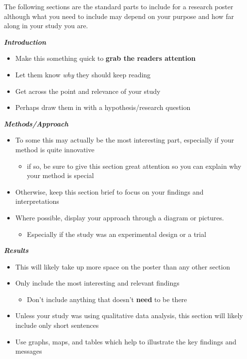 \documentclass[
]{book}
\providecommand{\tightlist}{%
  \setlength{\itemsep}{0pt}\setlength{\parskip}{0pt}}
\begin{document}
The following sections are the standard parts to include for a research poster although what you need to include may depend on your purpose and how far along in your study you are.

\textbf{\emph{Introduction}}

\begin{itemize}
\tightlist
\item
  Make this something quick to \textbf{grab the readers attention}
\item
  Let them know \emph{why} they should keep reading
\item
  Get across the point and relevance of your study
\item
  Perhaps draw them in with a hypothesis/research question
\end{itemize}

\textbf{\emph{Methods/Approach}}

\begin{itemize}
\tightlist
\item
  To some this may actually be the most interesting part, especially if your method is quite innovative

  \begin{itemize}
  \tightlist
  \item
    if so, be sure to give this section great attention so you can explain why your method is special
  \end{itemize}
\item
  Otherwise, keep this section brief to focus on your findings and interpretations
\item
  Where possible, display your approach through a diagram or pictures.

  \begin{itemize}
  \tightlist
  \item
    Especially if the study was an experimental design or a trial
  \end{itemize}
\end{itemize}

\textbf{\emph{Results}}

\begin{itemize}
\tightlist
\item
  This will likely take up more space on the poster than any other section
\item
  Only include the most interesting and relevant findings

  \begin{itemize}
  \tightlist
  \item
    Don't include anything that doesn't \textbf{need} to be there
  \end{itemize}
\item
  Unless your study was using qualitative data analysis, this section will likely include only short sentences
\item
  Use graphs, maps, and tables which help to illustrate the key findings and messages
\end{itemize}
\end{document}
